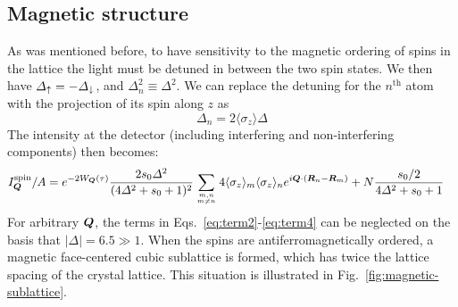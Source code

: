 \subsection{Magnetic structure}

As was mentioned before, to have sensitivity to the magnetic ordering of spins
in the lattice the light must be detuned in between the two spin states.   We
then have $\Delta_{ \uparrow } = - \Delta_{ \downarrow}$,  and $\Delta_{n}^{2} \equiv
\Delta^{2} $.   We can replace the detuning for the $n^{\mathrm{th}}$ atom with
the projection of its spin along $z$ as
\begin{equation}
  \Delta_{n} = 2 \langle \sigma_{z} \rangle \Delta
\end{equation} 
The intensity at the detector (including interfering and non-interfering
components) then becomes:  \vspace{1em} 
\begin{equation}
\begin{split}
 I_{\bv{Q}}^{\mathrm{spin}}/A  &   = 
 \debyew 
\frac{  2 s_{0} \Delta^{2}}{ (4\Delta^{2} + s_{0} + 1)^{2}} 
   \sumOff
  4
  \langle \sigma_{z} \rangle_{m}  \langle \sigma_{z} \rangle_{n}
  e^{ i \bv{Q} \cdot ( \bv{R}_{n} - \bv{R}_{m} ) }   + 
   N \frac{ s_{0}/2}{ 4\Delta^{2} + s_{0} + 1} 
\end{split}
\vspace{1em} 
\end{equation}
For arbitrary $\bm{Q}$, the terms in Eqs.~\ref{eq:term2}-\ref{eq:term4} can be
neglected on the basis that $|\Delta| = 6.5 \gg 1$.   When the spins are
antiferromagnetically  ordered,  a magnetic face-centered cubic sublattice is
formed, which has twice the lattice spacing of the crystal lattice.  This
situation is illustrated in Fig.~\ref{fig:magnetic-sublattice}.   

